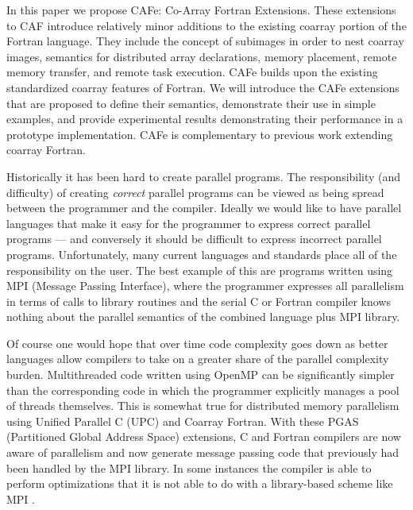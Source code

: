 In this paper we propose CAFe: Co-Array Fortran Extensions.  These extensions to CAF introduce
relatively minor additions to the existing coarray portion of the Fortran language.  They
include the concept of subimages in order to nest coarray images, semantics for distributed
array declarations, memory placement, remote memory transfer, and remote task execution.  CAFe
builds upon the existing standardized coarray features of Fortran.  We will introduce the
CAFe extensions that are proposed to define their semantics, demonstrate their use in simple
examples, and provide experimental results demonstrating their performance in a prototype implementation.
CAFe is complementary to
previous work extending coarray Fortran\cite{mellor-crummey:2009:caf2,jin:2011:caf2}.



Historically it has been hard to create parallel programs.  The
responsibility (and difficulty) of creating \emph{correct} parallel
programs can be viewed as being spread between the programmer and the
compiler.  Ideally we would like to have parallel languages that make
it easy for the programmer to express correct parallel programs --- and
conversely it should be difficult to express incorrect parallel
programs.  Unfortunately, many current languages and standards place
all of the responsibility on the user.  The best example of this are
programs written using MPI (Message Passing Interface), where the
programmer expresses all parallelism in terms of calls to library
routines and the serial C or Fortran compiler knows nothing about the
parallel semantics of the combined language plus MPI library.

Of course one would hope that over time code complexity goes down as
better languages allow compilers to take on a greater share of the
parallel complexity burden.  Multithreaded code written using OpenMP
can be significantly simpler than the corresponding code in which the
programmer explicitly manages a pool of threads themselves.  This is
somewhat true for distributed memory parallelism using Unified
Parallel C (UPC) and Coarray Fortran.  With these PGAS
(Partitioned Global Address Space) extensions, C and
Fortran compilers are now aware of parallelism and now generate
message passing code that previously had been handled by the MPI
library.  In some instances the compiler is able to perform
optimizations that it is not able to do with a library-based scheme
like MPI \cite{preissl:2011:SC}.

